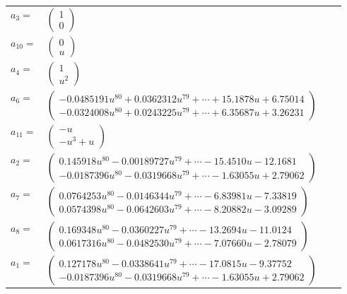 \documentclass[1p]{elsarticle_modified}
\theoremstyle{definition}
\begin{document}
\begin{tabular}{m{7pt} m{180pt} m{7pt} m{180pt} }
\flushright $a_{3}=$&$\begin{pmatrix}1\\0\end{pmatrix}$ \\
\flushright $a_{10}=$&$\begin{pmatrix}0\\u\end{pmatrix}$ \\
\flushright $a_{4}=$&$\begin{pmatrix}1\\u^2\end{pmatrix}$ \\
\flushright $a_{6}=$&$\begin{pmatrix}-0.0485191 u^{80}+0.0362312 u^{79}+\cdots+15.1878 u+6.75014\\-0.0324008 u^{80}+0.0243225 u^{79}+\cdots+6.35687 u+3.26231\end{pmatrix}$ \\
\flushright $a_{11}=$&$\begin{pmatrix}- u\\- u^3+u\end{pmatrix}$ \\
\flushright $a_{2}=$&$\begin{pmatrix}0.145918 u^{80}-0.00189727 u^{79}+\cdots-15.4510 u-12.1681\\-0.0187396 u^{80}-0.0319668 u^{79}+\cdots-1.63055 u+2.79062\end{pmatrix}$ \\
\flushright $a_{7}=$&$\begin{pmatrix}0.0764253 u^{80}-0.0146344 u^{79}+\cdots-6.83981 u-7.33819\\0.0574398 u^{80}-0.0642603 u^{79}+\cdots-8.20882 u-3.09289\end{pmatrix}$ \\
\flushright $a_{8}=$&$\begin{pmatrix}0.169348 u^{80}-0.0360227 u^{79}+\cdots-13.2694 u-11.0124\\0.0617316 u^{80}-0.0482530 u^{79}+\cdots-7.07660 u-2.78079\end{pmatrix}$ \\
\flushright $a_{1}=$&$\begin{pmatrix}0.127178 u^{80}-0.0338641 u^{79}+\cdots-17.0815 u-9.37752\\-0.0187396 u^{80}-0.0319668 u^{79}+\cdots-1.63055 u+2.79062\end{pmatrix}$ \\

\end{tabular}
\end{document}
